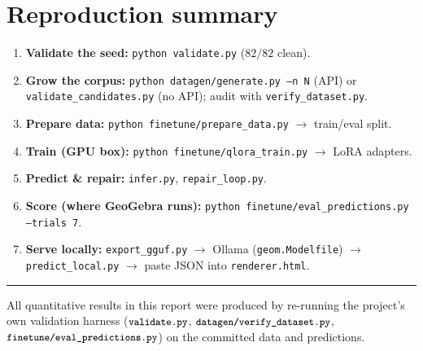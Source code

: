 \documentclass[11pt]{article}
\newcommand{\code}[1]{\texttt{\small #1}}
\begin{document}
\section{Reproduction summary}
\begin{enumerate}[nosep]
  \item \textbf{Validate the seed:} \code{python validate.py} ($82/82$ clean).
  \item \textbf{Grow the corpus:} \code{python datagen/generate.py --n N}
        (API) or \code{validate\_candidates.py} (no API); audit with
        \code{verify\_dataset.py}.
  \item \textbf{Prepare data:} \code{python finetune/prepare\_data.py}
        $\to$ train/eval split.
  \item \textbf{Train (GPU box):} \code{python finetune/qlora\_train.py}
        $\to$ LoRA adapters.
  \item \textbf{Predict \& repair:} \code{infer.py}, \code{repair\_loop.py}.
  \item \textbf{Score (where GeoGebra runs):}
        \code{python finetune/eval\_predictions.py --trials 7}.
  \item \textbf{Serve locally:} \code{export\_gguf.py} $\to$ Ollama
        (\code{geom.Modelfile}) $\to$ \code{predict\_local.py} $\to$ paste JSON
        into \code{renderer.html}.
\end{enumerate}

\bigskip\hrule\medskip
\noindent\footnotesize All quantitative results in this report were produced by
re-running the project's own validation harness ($\code{validate.py}$,
$\code{datagen/verify\_dataset.py}$, $\code{finetune/eval\_predictions.py}$) on
the committed data and predictions.
\end{document}
